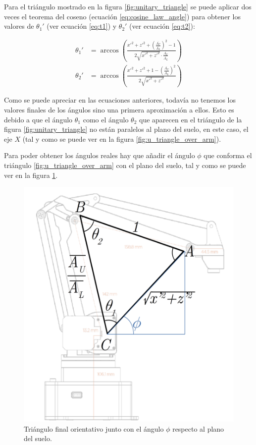 Para el triángulo mostrado en la figura \ref{fig:unitary_triangle} se puede aplicar
dos veces el teorema del coseno (ecuación \ref{eq:cosine_law_angle}) para obtener
los valores de $\theta_1'$ (ver ecuación \ref{eq:t1}) y $\theta_2'$ (ver ecuación \ref{eq:t2}):

\begin{align}
    \theta_1' &= \arccos{\left(\frac{x'^2 + z'^2 + \left(\frac{\overline{A_U}}{\overline{A_L}}\right)^2 - 1}%
    {2\sqrt{x'^2 + z'^2} \cdot \frac{\overline{A_U}}{\overline{A_L}}}\right)} \label{eq:t1} \\[2ex]
    \theta_2' &= \arccos{\left(\frac{x'^2 + z'^2 + 1 - \left(\frac{\overline{A_U}}{\overline{A_L}}\right)^2}%
    {2\sqrt{x'^2 + z'^2}}\right)} \label{eq:t2}
\end{align}

Como se puede apreciar en las ecuaciones anteriores, todavía no tenemos los valores finales
de los ángulos sino una primera aproximación a ellos. Esto es debido a que el ángulo
$\theta_1$ como el ángulo $\theta_2$ que aparecen en el triángulo de la figura \ref{fig:unitary_triangle}
no están paralelos al plano del suelo, en este caso, el eje $X$ (tal y como se puede ver
en la figura \ref{fig:u_triangle_over_arm}).

Para poder obtener los ángulos reales hay que añadir el ángulo $\phi$ que conforma el triángulo
\ref{fig:u_triangle_over_arm} con el plano del suelo, tal y como se puede ver en la figura
\ref{fig:final_triangle}.

\begin{figure}[H]
    \centering
    \includegraphics[width=.7\linewidth]{pictures/ik_final.png}
    \caption{Triángulo final orientativo junto con el ángulo $\phi$ respecto al plano del suelo.}
    \label{fig:final_triangle}
\end{figure}

